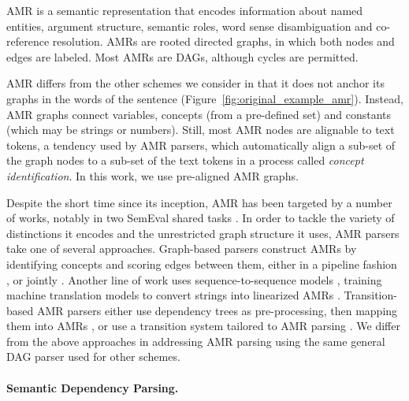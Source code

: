 \documentclass[11pt,a4paper]{article}
\begin{document}
AMR \cite{banarescu2013abstract} is a semantic representation that encodes information about named entities, 
argument structure, semantic roles, word sense disambiguation and co-reference resolution.
AMRs are rooted directed graphs, in which both nodes and edges are labeled.
Most AMRs are DAGs, although cycles are permitted.

AMR differs from the other schemes we consider in that it does not anchor its graphs
in the words of the sentence (Figure~\ref{fig:original_example_amr}). Instead, AMR graphs
connect variables, concepts (from a pre-defined set) and constants (which may be strings or numbers).
Still, most AMR nodes are alignable to text tokens, a tendency used by AMR parsers,
which automatically align a sub-set of the graph nodes to a sub-set of the text tokens in a process
called \textit{concept identification}. In this work, we use pre-aligned AMR graphs.

Despite the short time since its inception, AMR has been targeted by a number of works,
notably in two SemEval shared tasks \cite{may2016semeval,may2017semeval}.
In order to tackle the variety of distinctions it encodes and the unrestricted graph structure
it uses, AMR parsers take one of several approaches.
Graph-based parsers construct AMRs
by identifying concepts and scoring edges between them, either in a pipeline fashion
\cite{flanigan2014discriminative,artzi2015broad,pust2015parsing,foland2017abstract},
or jointly \cite{zhou2016amr}.
Another line of work uses sequence-to-sequence models \cite{sutskever2014sequence},
training machine translation models to convert strings into linearized AMRs
\cite{barzdins2016riga,Gildea2017AddressingTD,Konstas2017NeuralAS,Buys2017RobustIN}.
Transition-based AMR parsers either 
use dependency trees as pre-processing, then mapping them into AMRs
\cite{wang-xue-pradhan:2015:ACL-IJCNLP,wang2015transition,wang-EtAl:2016:SemEval,goodman2016noise},
or use a transition system tailored to AMR parsing \cite{damonte-17,D17-1130}.
We differ from the above approaches in addressing AMR parsing 
using the same general DAG parser used for other schemes.


\paragraph{Semantic Dependency Parsing.}\label{sec:sdp}
\end{document}
